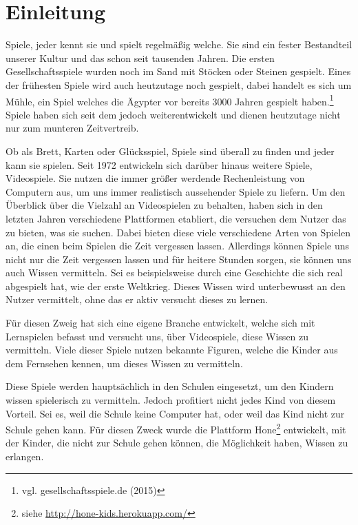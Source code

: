 \chapter{Einleitung}


Spiele, jeder kennt sie und spielt regelmäßig welche. Sie sind ein fester Bestandteil unserer Kultur und das schon seit tausenden Jahren. Die ersten Gesellschaftsspiele wurden noch im Sand mit Stöcken oder Steinen gespielt. Eines der frühesten Spiele wird auch heutzutage noch gespielt, dabei handelt es sich um Mühle, ein Spiel welches die Ägypter vor bereits 3000 Jahren gespielt haben.\footnote{vgl. gesellschaftsspiele.de \cite{spiele} (2015)} Spiele haben sich seit dem jedoch weiterentwickelt und dienen heutzutage nicht nur zum munteren Zeitvertreib. 

Ob als Brett, Karten oder Glücksspiel, Spiele sind überall zu finden und jeder kann sie spielen. Seit 1972 entwickeln sich darüber hinaus weitere Spiele, Videospiele. Sie nutzen die immer größer werdende Rechenleistung von Computern aus, um uns immer realistisch aussehender Spiele zu liefern. 
Um den Überblick über die Vielzahl an Videospielen zu behalten, haben sich in den letzten Jahren verschiedene Plattformen etabliert, die versuchen dem Nutzer das zu bieten, was sie suchen. Dabei bieten diese viele verschiedene Arten von Spielen an, die einen beim Spielen die Zeit vergessen lassen. %
Allerdings können Spiele uns nicht nur die Zeit vergessen lassen und für heitere Stunden sorgen, sie können uns auch Wissen vermitteln. Sei es beispielsweise durch eine Geschichte die sich real abgespielt hat, wie der erste Weltkrieg. Dieses Wissen wird unterbewusst an den Nutzer vermittelt, ohne das er aktiv versucht dieses zu lernen.

Für diesen Zweig hat sich eine eigene Branche entwickelt, welche sich mit Lernspielen befasst und versucht uns, über Videospiele, diese Wissen zu vermitteln. Viele dieser Spiele nutzen bekannte Figuren, welche die Kinder aus dem Fernsehen kennen, um dieses Wissen zu vermitteln.

Diese Spiele werden hauptsächlich in den Schulen eingesetzt, um den Kindern wissen spielerisch zu vermitteln. Jedoch profitiert nicht jedes Kind von diesem Vorteil. Sei es, weil die Schule keine Computer hat, oder weil das Kind nicht zur Schule gehen kann. Für diesen Zweck wurde die Plattform Hone\footnote{siehe \url{http://hone-kids.herokuapp.com/}} entwickelt, mit der Kinder, die nicht zur Schule gehen können, die Möglichkeit haben, Wissen zu erlangen. 

